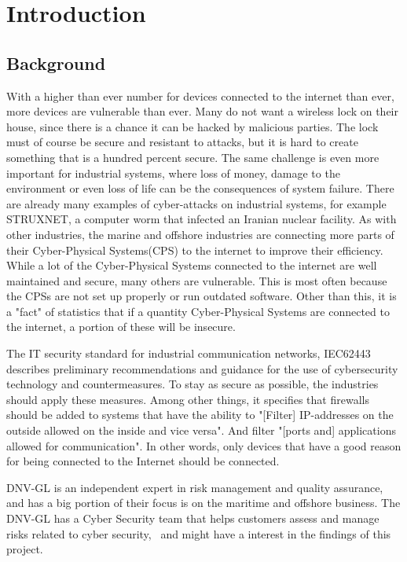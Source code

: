 \section{Introduction} \label{sec:intro}

\subsection{Background} \label{sec:background}
With a higher than ever number for devices connected to the internet than ever\cite{iot_stats}, more devices are vulnerable than ever. Many do not want a wireless lock on their house, since there is a chance it can be hacked by malicious parties. The lock must of course be secure and resistant to attacks, but it is hard to create something that is a hundred percent secure. The same challenge is even more important for industrial systems, where loss of money, damage to the environment or even loss of life can be the consequences of system failure. There are already many examples of cyber-attacks on industrial systems, for example STRUXNET\cite{struxnet}, a computer worm that infected an Iranian nuclear facility. 
As with other industries, the marine and offshore industries are connecting more parts of their Cyber-Physical Systems(CPS) to the internet to improve their efficiency. While a lot of the Cyber-Physical Systems connected to the internet are well maintained and secure, many others are vulnerable. This is most often because the CPSs are not set up properly or run outdated software. Other than this, it is a "fact" of statistics that if a quantity Cyber-Physical Systems are connected to the internet, a portion of these will be insecure. 

The IT security standard for industrial communication networks, IEC62443 describes preliminary recommendations and guidance for the use of cybersecurity technology and countermeasures. To stay as secure as possible, the industries should apply these measures.\cite{IEC62443} Among other things, it specifies that firewalls should be added to systems that have the ability to "[Filter] IP-addresses on the outside allowed on the inside and vice versa". And filter "[ports and] applications allowed for communication". In other words, only devices that have a good reason for being connected to the Internet should be connected. 

DNV-GL is an independent expert in risk management and quality assurance, and has a big portion of their focus is on the maritime and offshore business. The DNV-GL has a Cyber Security team that helps customers assess and manage risks related to cyber security,~\cite{DNVGL_cybersec} and might have a interest in the findings of this project.

